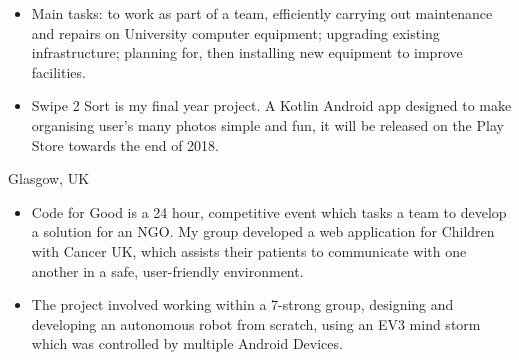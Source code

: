 \documentclass[9pt,a4paper]{altacv}
\begin{document}
\begin{itemize}
\item Main tasks: to work as part of a team, efficiently carrying out maintenance and repairs on University computer equipment; upgrading existing infrastructure; planning for, then installing new equipment to improve facilities.
\end{itemize}



\begin{itemize}
\item Swipe 2 Sort is my final year project. A Kotlin Android app designed to make organising user's many photos simple and fun, it will be released on the Play Store towards the end of 2018.
\end{itemize}
\divider


  {Glasgow, UK}
\begin{itemize}
\item Code for Good is a 24 hour, competitive event which tasks a team to develop a solution for an NGO. My group developed a web application for Children with Cancer UK, which assists their patients to communicate with one another in a safe, user-friendly environment.
\end{itemize}
\divider

\begin{itemize}
\item The project involved working within a 7-strong group, designing and developing an autonomous robot from scratch, using an EV3 mind storm which was controlled by multiple Android Devices.
\end{itemize}
\divider
\end{document}

